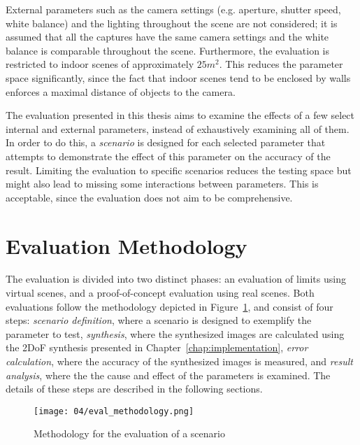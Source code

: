 External parameters such as the camera settings (e.g. aperture, shutter speed, white balance) and the lighting throughout the scene are not considered; it is assumed that all the captures have the same camera settings and the white balance is comparable throughout the scene. Furthermore, the evaluation is restricted to indoor scenes of approximately $25m^2$. This reduces the parameter space significantly, since the fact that indoor scenes tend to be enclosed by walls enforces a maximal distance of objects to the camera.

The evaluation presented in this thesis aims to examine the effects of a few select internal and external parameters, instead of exhaustively examining all of them. In order to do this, a \emph{scenario} is designed for each selected parameter that attempts to demonstrate the effect of this parameter on the accuracy of the result. Limiting the evaluation to specific scenarios reduces the testing space but might also lead to missing some interactions between parameters. This is acceptable, since the evaluation does not aim to be comprehensive. 


\section{Evaluation Methodology} \label{sec:eval_methodology}
The evaluation is divided into two distinct phases: an evaluation of limits using virtual scenes, and a proof-of-concept evaluation using real scenes. Both evaluations follow the methodology depicted in Figure~\ref{fig:eval-methodology}, and consist of four steps: \emph{scenario definition}, where a scenario is designed to exemplify the parameter to test, \emph{synthesis}, where the synthesized images are calculated using the 2DoF synthesis presented in Chapter~\ref{chap:implementation}, \emph{error calculation}, where the accuracy of the synthesized images is measured, and \emph{result analysis}, where the the cause and effect of the parameters is examined. The details of these steps are described in the following sections.

\begin{figure}
		\centering
		\texttt{[image: 04/eval\_methodology.png]}
		\caption{Methodology for the evaluation of a scenario}
		\label{fig:eval-methodology}
\end{figure}

